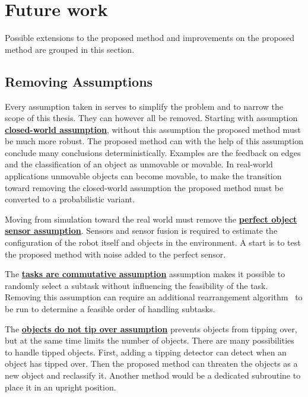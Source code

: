 \section{Future work}%
\label{sec:future_work}
Possible extensions to the proposed method and improvements on the proposed method are grouped in this section.\bs

\subsection{Removing Assumptions}
Every assumption taken in  serves to simplify the problem and to narrow the scope of this thesis. They can however all be removed. Starting with assumption \hyperref[assumption:closed_world]{\textbf{closed-world assumption}}, without this assumption the proposed method must be much more robust. The proposed method can with the help of this assumption conclude many conclusions deterministically. Examples are the feedback on edges and the classification of an object as unmovable or movable. In real-world applications unmovable objects can become movable, to make the transition toward removing the closed-world assumption the proposed method must be converted to a probabilistic variant.\bs

Moving from simulation toward the real world must remove the \hyperref[assumption:perfect_object_sensor]{\textbf{perfect object sensor assumption}}. Sensors and sensor fusion is required to estimate the configuration of the robot itself and objects in the environment. A start is to test the proposed method with noise added to the perfect sensor.\bs

The \hyperref[assumption:order_does_not_matter]{\textbf{tasks are commutative assumption}} assumption makes it possible to randomly select a subtask without influencing the feasibility of the task. Removing this assumption can require an additional rearrangement algorithm~\cite{krontiris_dealing_2015} to be run to determine a feasible order of handling subtasks.\bs

The \hyperref[assumption:no_tipping]{\textbf{objects do not tip over assumption}} prevents objects from tipping over, but at the same time limits the number of objects. There are many possibilities to handle tipped objects. First, adding a tipping detector can detect when an object has tipped over. Then the proposed method can threaten the objects as a new object and reclassify it. Another method would be a dedicated subroutine to place it in an upright position.\bs

%
